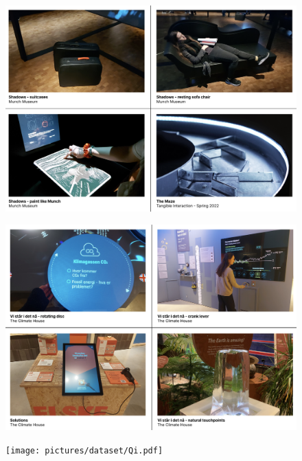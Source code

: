 \begin{figure}[H]
\includegraphics[width=13cm]{pictures/dataset/munch_3.png}
\centering 
\end{figure}

\begin{figure}[H]
\includegraphics[width=13cm]{pictures/dataset/klimahuset.png}
\centering 
\end{figure}

\begin{figure}[H]
\texttt{[image: pictures/dataset/Qi.pdf]}
\centering 
\end{figure}

